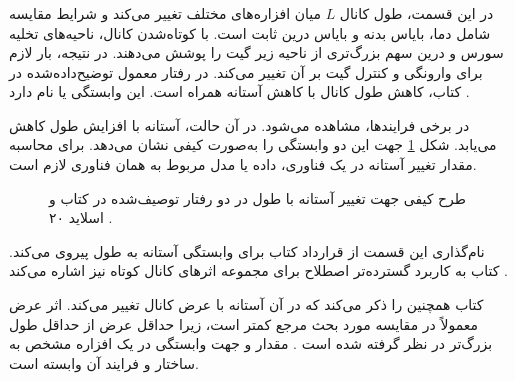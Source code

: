 \subsubsection{}
\label{sec:short-channel-threshold}
در این قسمت، طول کانال \(L\) میان افزاره‌های مختلف تغییر می‌کند و
شرایط مقایسه شامل دما، بایاس بدنه و بایاس درین ثابت است.
با کوتاه‌شدن کانال، ناحیه‌های تخلیه سورس و درین سهم بزرگ‌تری از ناحیه
زیر گیت را پوشش می‌دهند. در نتیجه، بار لازم برای وارونگی و کنترل گیت
بر آن تغییر می‌کند. در رفتار معمول توضیح‌داده‌شده در کتاب، کاهش طول
کانال با کاهش آستانه همراه است. این وابستگی
 یا  نام دارد
\cite[بخش ]{weste}\cite[اسلاید ۲۰]{nonideal}.

در برخی فرایندها،  مشاهده می‌شود.
در آن حالت، آستانه با افزایش طول کاهش می‌یابد. شکل
\ref{fig:threshold-length-schematic} جهت این دو وابستگی را به‌صورت
کیفی نشان می‌دهد. برای محاسبه مقدار تغییر آستانه در یک فناوری، داده
یا مدل مربوط به همان فناوری لازم است.

\begin{figure}[!htbp]
\centering
\begin{latin}
\end{latin}
\caption{طرح کیفی جهت تغییر آستانه با طول در دو رفتار توصیف‌شده در کتاب
و اسلاید ۲۰
\cite[بخش ]{weste}\cite{nonideal}.}
\label{fig:threshold-length-schematic}
\end{figure}

نام‌گذاری این قسمت از قرارداد کتاب برای وابستگی آستانه به طول پیروی
می‌کند. کتاب به کاربرد گسترده‌تر اصطلاح  برای
مجموعه اثرهای کانال کوتاه نیز اشاره می‌کند
\cite[پانوشت صفحه چاپی ۸۰]{weste}.

کتاب همچنین  را ذکر می‌کند که در آن آستانه
با عرض کانال تغییر می‌کند. اثر عرض معمولاً در مقایسه مورد بحث مرجع
کمتر است، زیرا حداقل عرض از حداقل طول بزرگ‌تر در نظر گرفته شده است
\cite[صفحه چاپی ۸۰]{weste}. مقدار و جهت وابستگی در یک افزاره مشخص به
ساختار و فرایند آن وابسته است.

